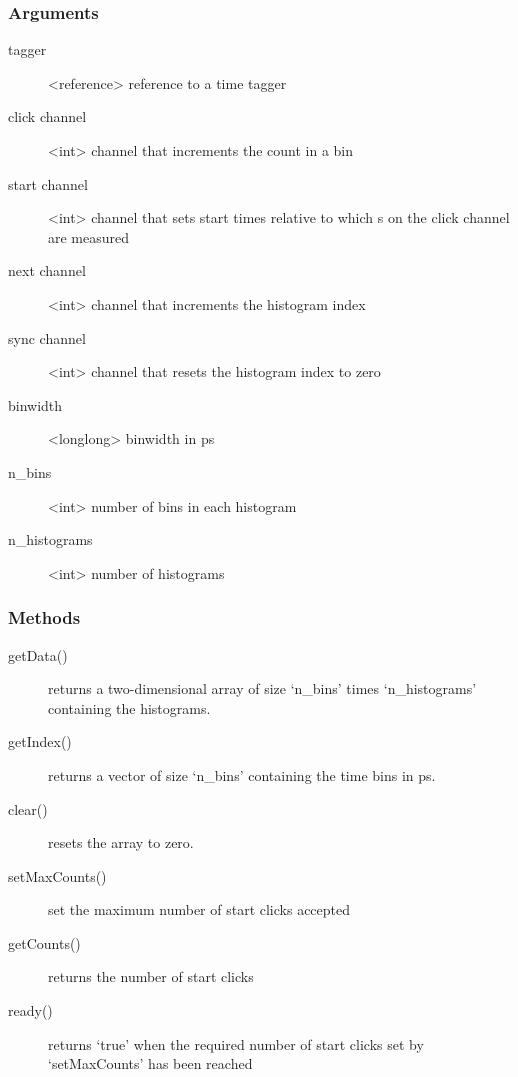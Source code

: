\documentclass[letterpaper,10pt,english]{sphinxmanual}
\begin{document}
\subsubsection{Arguments}
\label{sections/api:id14}\begin{description}
\item[{tagger}] \leavevmode
\textless{}reference\textgreater{} reference to a time tagger

\item[{click channel}] \leavevmode
\textless{}int\textgreater{} channel that increments the count in a bin

\item[{start channel}] \leavevmode
\textless{}int\textgreater{} channel that sets start times relative to which s on the click channel are measured

\item[{next channel}] \leavevmode
\textless{}int\textgreater{} channel that increments the histogram index

\item[{sync channel}] \leavevmode
\textless{}int\textgreater{} channel that resets the histogram index to zero

\item[{binwidth}] \leavevmode
\textless{}longlong\textgreater{} binwidth in ps

\item[{n\_bins}] \leavevmode
\textless{}int\textgreater{} number of bins in each histogram

\item[{n\_histograms}] \leavevmode
\textless{}int\textgreater{} number of histograms

\end{description}


\subsubsection{Methods}
\label{sections/api:id15}\begin{description}
\item[{getData()}] \leavevmode
returns a two-dimensional array of size `n\_bins' times `n\_histograms' containing the histograms.

\item[{getIndex()}] \leavevmode
returns a vector of size `n\_bins' containing the time bins in ps.

\item[{clear()}] \leavevmode
resets the array to zero.

\item[{setMaxCounts()}] \leavevmode
set the maximum number of start clicks accepted

\item[{getCounts()}] \leavevmode
returns the number of start clicks

\item[{ready()}] \leavevmode
returns `true' when the required number of start clicks set by `setMaxCounts' has been reached

\end{description}
\end{document}
